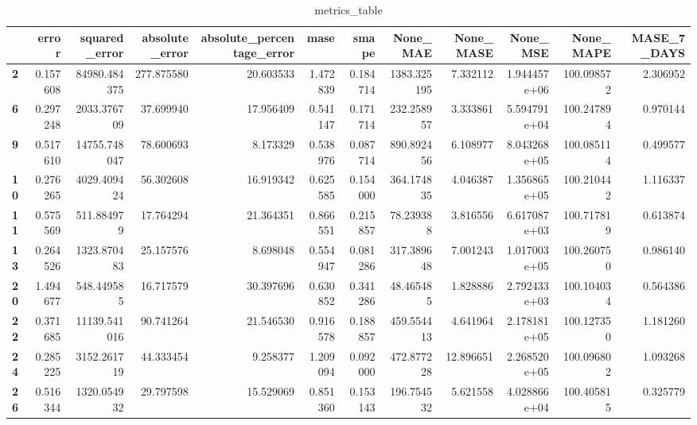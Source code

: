 \begin{table}[h]
\centering
\caption{metrics_table}
\label{table:Final tuning for dataset 1 local multivariate.}
\begin{tabular}{lrrrrrrrrrrr}
\toprule
{} &     error &  squared\_error &  absolute\_error &  absolute\_percentage\_error &      mase &     smape &     None\_MAE &  None\_MASE &      None\_MSE &   None\_MAPE &  MASE\_7\_DAYS \\
\midrule
\textbf{2 } &  0.157608 &   84980.484375 &      277.875580 &                  20.603533 &  1.472839 &  0.184714 &  1383.325195 &   7.332112 &  1.944457e+06 &  100.098572 &     2.306952 \\
\textbf{6 } &  0.297248 &    2033.376709 &       37.699940 &                  17.956409 &  0.541147 &  0.171714 &   232.258957 &   3.333861 &  5.594791e+04 &  100.247894 &     0.970144 \\
\textbf{9 } &  0.517610 &   14755.748047 &       78.600693 &                   8.173329 &  0.538976 &  0.087714 &   890.892456 &   6.108977 &  8.043268e+05 &  100.085114 &     0.499577 \\
\textbf{10} &  0.276265 &    4029.409424 &       56.302608 &                  16.919342 &  0.625585 &  0.154000 &   364.174835 &   4.046387 &  1.356865e+05 &  100.210442 &     1.116337 \\
\textbf{11} &  0.575569 &     511.884979 &       17.764294 &                  21.364351 &  0.866551 &  0.215857 &    78.239388 &   3.816556 &  6.617087e+03 &  100.717819 &     0.613874 \\
\textbf{13} &  0.264526 &    1323.870483 &       25.157576 &                   8.698048 &  0.554947 &  0.081286 &   317.389648 &   7.001243 &  1.017003e+05 &  100.260750 &     0.986140 \\
\textbf{20} &  1.494677 &     548.449585 &       16.717579 &                  30.397696 &  0.630852 &  0.341286 &    48.465485 &   1.828886 &  2.792433e+03 &  100.104034 &     0.564386 \\
\textbf{22} &  0.371685 &   11139.541016 &       90.741264 &                  21.546530 &  0.916578 &  0.188857 &   459.554413 &   4.641964 &  2.178181e+05 &  100.127350 &     1.181260 \\
\textbf{24} &  0.285225 &    3152.261719 &       44.333454 &                   9.258377 &  1.209094 &  0.092000 &   472.877228 &  12.896651 &  2.268520e+05 &  100.096802 &     1.093268 \\
\textbf{26} &  0.516344 &    1320.054932 &       29.797598 &                  15.529069 &  0.851360 &  0.153143 &   196.754532 &   5.621558 &  4.028866e+04 &  100.405815 &     0.325779 \\

\end{tabular}
\end{table}
